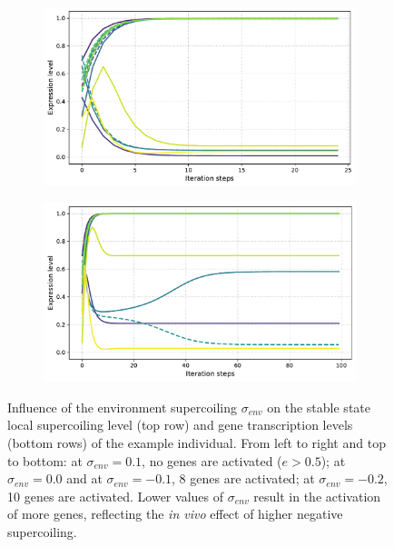\begin{figure}[H]
\begin{subfigure}[t]{0.48\textwidth}
\includegraphics[width=\textwidth]{alife/img/13genes_sigma_1.pdf}
\label{subfig:alife:sigma_1}
\end{subfigure}
\begin{subfigure}[t]{0.48\textwidth}
\includegraphics[width=\textwidth]{alife/img/13genes_sigma_0.pdf}
\label{subfig:alife:sigma_0}
\end{subfigure}
\caption[Influence of environmental supercoiling on the phenotype of the example individual in Figure~\ref{fig:alife:13genes}]{Influence of the environment supercoiling $\sigma_{env}$ on the stable state local supercoiling level (top row) and gene transcription levels (bottom rows) of the example individual.
From left to right and top to bottom: at $\sigma_{env} = 0.1$, no genes are activated ($e > 0.5$); at $\sigma_{env} = 0.0$ and at $\sigma_{env} = -0.1$, 8 genes are activated; at $\sigma_{env} = -0.2$, 10 genes are activated.
Lower values of $\sigma_{env}$ result in the activation of more genes, reflecting the \emph{in vivo} effect of higher negative supercoiling.}
\label{fig:alife:sigma_env}
\end{figure}

